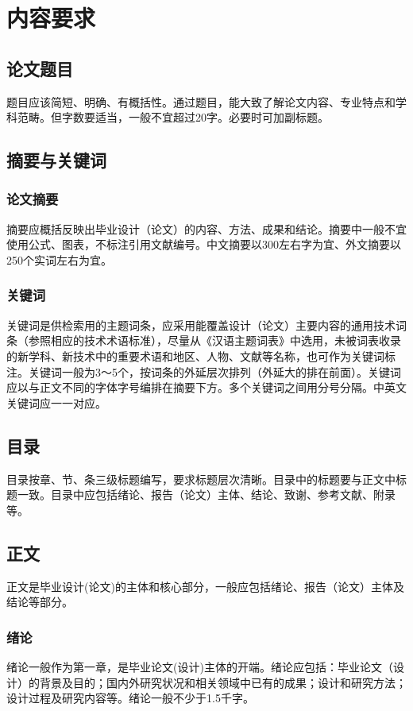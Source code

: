 \chapter{内容要求}
\section{论文题目}
题目应该简短、明确、有概括性。通过题目，能大致了解论文内容、专业特点和学科范畴。但字数要适当，一般不宜超过20字。必要时可加副标题。

\section{摘要与关键词}
\subsection{论文摘要}
摘要应概括反映出毕业设计（论文）的内容、方法、成果和结论。摘要中一般不宜使用公式、图表，不标注引用文献编号。中文摘要以300左右字为宜、外文摘要以250个实词左右为宜。

\subsection{关键词}
关键词是供检索用的主题词条，应采用能覆盖设计（论文）主要内容的通用技术词条（参照相应的技术术语标准），尽量从《汉语主题词表》中选用，未被词表收录的新学科、新技术中的重要术语和地区、人物、文献等名称，也可作为关键词标注。关键词一般为3～5个，按词条的外延层次排列（外延大的排在前面）。关键词应以与正文不同的字体字号编排在摘要下方。多个关键词之间用分号分隔。中英文关键词应一一对应。

\section{目录}
目录按章、节、条三级标题编写，要求标题层次清晰。目录中的标题要与正文中标题一致。目录中应包括绪论、报告（论文）主体、结论、致谢、参考文献、附录等。

\section{正文}
正文是毕业设计(论文)的主体和核心部分，一般应包括绪论、报告（论文）主体及结论等部分。

\subsection{绪论}
绪论一般作为第一章，是毕业论文(设计)主体的开端。绪论应包括：毕业论文（设计）的背景及目的；国内外研究状况和相关领域中已有的成果；设计和研究方法；设计过程及研究内容等。绪论一般不少于1.5千字。

